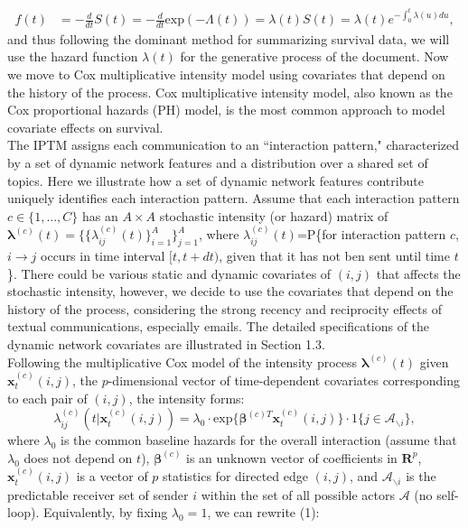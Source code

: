 \documentclass[a4paper]{article}
\begin{document}
				\begin{align*}
				f(t) &=-\frac{d}{dt}S(t) = -\frac{d}{dt}\mbox{exp}(-\Lambda(t)) = \lambda(t)S(t) = \lambda(t)e^{-\int_{0}^{t}\lambda(u)du},
				\end{align*}
and thus following the dominant method for summarizing survival data, we will use the hazard function $\lambda(t)$ for the generative process of the document. Now we move to Cox multiplicative intensity model \citep{cox1992regression} using covariates
that depend on the history of the process. Cox multiplicative intensity model, also known as the Cox proportional hazards (PH) model, is the most common approach to model covariate effects on survival. \\ \newline
The IPTM assigns each communication to an ``interaction pattern," characterized by a set of dynamic network features and a distribution over a shared set of topics. Here we illustrate how a set of dynamic network features contribute uniquely identifies each interaction pattern. Assume that each interaction pattern $c \in \{1,...,C\}$ has an $A\times A$ stochastic intensity (or hazard) matrix of $\boldsymbol{\lambda}^{(c)}(t) = \{\{\lambda^{(c)}_{ij}(t)\}_{i=1}^{A}\}_{j=1}^{A}$, where $\lambda^{(c)}_{ij}(t)$=P\{for interaction pattern $c$, $i\rightarrow j$ occurs in time interval $[t, t+dt)$, given that it has not ben sent until time $t$\}. There could be various static and dynamic covariates of $(i, j)$ that affects the stochastic intensity, however, we decide to use the covariates
that depend on the history of the process, considering the strong recency and reciprocity effects of textual communications, especially emails. The detailed specifications of the dynamic network covariates are illustrated in Section 1.3.\\ \newline
Following the multiplicative Cox model of the intensity process $\boldsymbol{\lambda}^{(c)}(t)$ given $\boldsymbol{x}_t^{(c)}(i, j)$, the $p$-dimensional vector of time-dependent covariates corresponding to each pair of $(i, j)$, the intensity forms:
\begin{equation}
\lambda^{(c)}_{ij}(t|\boldsymbol{x}_t^{(c)}(i, j))=\lambda_0\cdot \mbox{exp}\Big\{\boldsymbol{\beta}^{(c)T}\boldsymbol{x}^{(c)}_t(i, j)\Big\}\cdot 1\{j \in \mathcal{A}_{\backslash i}\},
\end{equation}
where $\lambda_0$ is the common baseline hazards for the overall interaction (assume that $\lambda_0$ does not depend on $t$), $\boldsymbol{\beta}^{(c)}$ is an unknown vector of coefficients in $\boldsymbol{R}^{p}$, $\boldsymbol{x}^{(c)}_t(i, j)$ is a vector of $p$ statistics for directed edge $(i, j)$, and $\mathcal{A}_{\backslash i}$ is the predictable receiver set of sender $i$ within the set of all possible actors $\mathcal{A}$ (no self-loop). Equivalently, by fixing $\lambda_0=1$, we can rewrite (1): 
\end{document}
